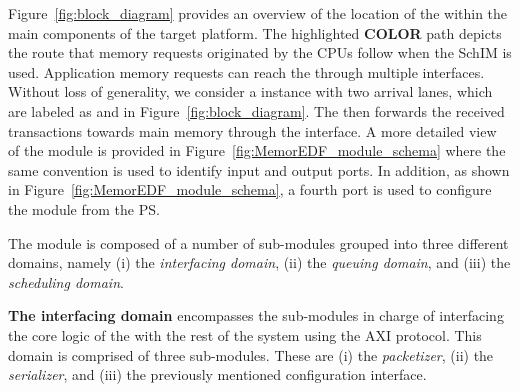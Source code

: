 Figure~\ref{fig:block_diagram} provides an overview of the location of
the \schim within the main components of the target platform. The
highlighted {\bf COLOR} path depicts the route that memory requests
originated by the CPUs follow when the SchIM is used. Application
memory requests can reach the \schim through multiple
interfaces. Without loss of generality, we consider a \schim instance
with two arrival lanes, which are labeled as  and 
in Figure~\ref{fig:block_diagram}. The \schim then forwards the
received transactions towards main memory through the 
interface. A more detailed view of the \schim module is provided in
Figure~\ref{fig:MemorEDF_module_schema} where the same convention is
used to identify input and output ports. In addition, as shown in
Figure~\ref{fig:MemorEDF_module_schema}, a fourth  port is
used to configure the \schim module from the PS.




The \schim module is composed of a number of sub-modules grouped into
three different domains, namely (i) the \emph{interfacing domain},
(ii) the \emph{queuing domain}, and (iii) the \emph{scheduling
  domain}.

\par{\bf The interfacing domain} encompasses the sub-modules in charge
of interfacing the core logic of the \schim with the rest of the
system using the AXI protocol.  This domain is comprised of three
sub-modules. These are (i) the \emph{packetizer}, (ii) the
\emph{serializer}, and (iii) the previously mentioned configuration
interface.

